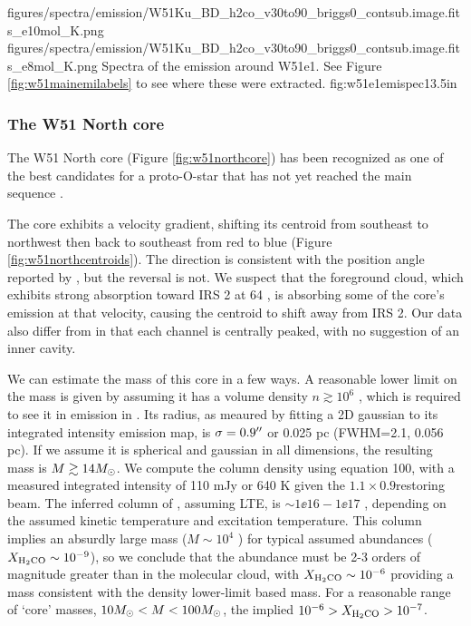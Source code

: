 \FigureTwoAA
{figures/spectra/emission/W51Ku_BD_h2co_v30to90_briggs0_contsub.image.fits_e10mol_K.png}
{figures/spectra/emission/W51Ku_BD_h2co_v30to90_briggs0_contsub.image.fits_e8mol_K.png}
{Spectra of the \twotwo emission around W51e1.  See Figure
\ref{fig:w51mainemilabels} to see where these were extracted.
}
{fig:w51e1emispec}{1}{3.5in}


\subsubsection{The W51 North core}
\label{sec:northcore}
The W51 North core (Figure \ref{fig:w51northcore}) has been recognized as one
of the best candidates for a proto-O-star that has not yet reached the main
sequence \citep{Zapata2009a,Zapata2010a,Goddi2015a}.  

The core exhibits a velocity gradient, shifting its centroid from southeast to
northwest then back to southeast from red to blue (Figure
\ref{fig:w51northcentroids}).  The direction is consistent
with the position angle reported by \citet{Zapata2010a}, but the reversal is
not.  We suspect that the foreground cloud, which exhibits strong absorption
toward IRS 2 at 64 \kms, is absorbing some of the core's emission at that
velocity, causing the centroid to shift away from IRS 2.  Our data also differ
from \citet{Zapata2010a} in that each channel is centrally peaked, with no
suggestion of an inner cavity.

We can estimate the mass of this core in a few ways.  A reasonable lower limit
on the mass is given by assuming it has a volume density $n\gtrsim10^6$ \percc,
which is required to see it in emission in \ortho \twotwo.  Its radius, as
meaured by fitting a 2D gaussian to its integrated intensity emission map, is
$\sigma=0.9\mbox{$^{\prime\prime}$}$ or 0.025 pc (FWHM=2.1\arcsec, 0.056 pc).  If we assume it
is spherical and gaussian in
all dimensions, the resulting mass is $M\gtrsim14M_{\odot}$.
We compute the \ortho \twotwo column density using \citet{Mangum2015a} equation
100, with a measured integrated intensity of 110 mJy \kms or 640 K \kms given
the $1.1\times0.9$\arcsec restoring beam.  The inferred column of \ortho,
assuming LTE, is $\sim1\ee{16} - 1\ee{17}$ \persc, depending on the assumed
kinetic temperature and excitation temperature.  This \formaldehyde column
implies an absurdly large mass ($M\sim10^4$ \msun) for typical assumed abundances
($X_{\textrm{H}_2\textrm{CO}}\sim10^{-9}$), so we conclude that the \formaldehyde abundance
must be 2-3 orders of magnitude greater than in the molecular cloud, with
$X_{\textrm{H}_2\textrm{CO}}\sim10^{-6}$ providing a mass consistent with the density
lower-limit based mass.  For a reasonable range of `core' masses, $10
M_{\odot}<M<100 M_{\odot}$, the implied $10^{-6} > X_{\textrm{H}_2\textrm{CO}} > 10^{-7}$.

